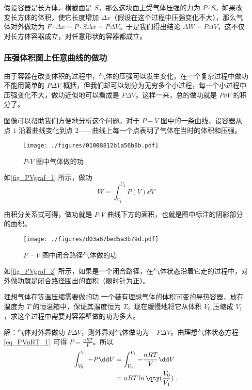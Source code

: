 假设容器是长方体，横截面是 $S$，那么这块面上受气体压强的力为 $P\cdot S$。如果改变长方体的体积，使它长度增加 $\Delta x$（假设在这个过程中压强变化不大），那么气体对外做功为 $F\cdot \Delta x=P\cdot S\Delta x=P\Delta V$。于是我们得出结论 $\Delta W=P\Delta V$，这不仅对长方体容器成立，对任意形状的容器都成立。
\subsubsection{压强体积图上任意曲线的做功}
由于容器在改变体积的过程中，气体的压强可以发生变化，在一个复杂过程中做功不能用简单的 $P\Delta V$ 概括，但我们却可以划分为无穷多个小过程，每一个小过程中压强变化不大，做功近似地可以看成是 $P\Delta V$。这样一来，总的做功就是 $P\dd V$ 的积分了。

图像可以帮助我们方便地分析这个问题。对于 $P-V$ 图中的一条曲线，设容器从点 $1$ 沿着曲线变化到点 $2$——曲线上每一个点表明了气体在当时的体积和压强。
\begin{figure}[ht]
\centering
\texttt{[image: ./figures/01008812b1a56b8b.pdf]}
\caption{$P$-$V$ 图中气体做的功} \label{fig_PVgraf_1}
\end{figure}

如\autoref{fig_PVgraf_1} 所示，做功
\begin{equation}\label{eq_PVgraf_1}
W = \int_{V_1}^{V_2}P(V) \dd{V}
\end{equation}

由积分关系式可得，做功就是 $P$-$V$ 曲线下方的面积，也就是图中标注的阴影部分的面积。 

\begin{figure}[ht]  
\centering
\texttt{[image: ./figures/d03a67bed5a3b79d.pdf]}
\caption{$P-V$ 图中闭合路径气体做的功} \label{fig_PVgraf_2}
\end{figure}

如\autoref{fig_PVgraf_2} 所示，如果是一个闭合路径，在气体状态沿着它走的过程中，对外做功就是闭合路径围出的面积（顺时针为正）。

\begin{example}{理想气体在等温压缩需要做的功}
一个装有理想气体的体积可变的导热容器，放在温度为 $T$ 的恒温箱中，保证其温度恒为 $T$。现在缓慢地将它从体积 $V_0$ 压缩成 $V_1$，求这个过程中需要对容器壁做的功为多大。

解：气体对外界做功 $P\Delta V$，则外界对气体做功为 $-P\Delta V$。由理想气体状态方程\autoref{eq_PVnRT_1}~可得 $P=\frac{nRT}{V}$。所以
\begin{equation}
\begin{aligned}
\int_{V_0}^{V_1} -P\dd V&=\int_{V_0}^{V_1} -\frac{nRT}{V} \dd V \\
&=nRT \ln\qty(\frac{V_0}{V_1})~.
\end{aligned}
\end{equation}
\end{example}
